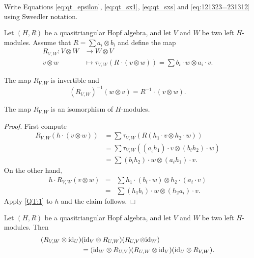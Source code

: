 \begin{exercise}
Write Equations \eqref{eq:qt_epsilon}, \eqref{eq:qt_sx1}, \eqref{eq:qt_sxs}
and \eqref{eq:121323=231312} using Sweedler notation.
\end{exercise}

\label{paragraph:QT_braiding}
Let $(H,R)$ be a quasitriangular Hopf algebra, and let $V$ and $W$ be
two left $H$-modules. Assume that $R=\sum a_{i}\otimes b_{i}$ and define the map
\begin{align*}
R_{V,W}:V\otimes W&\to W\otimes V\\
v\otimes w&\mapsto \tau_{V,W}\left(R\cdot (v\otimes w)\right)=\sum b_{i}\cdot w\otimes a_{i}\cdot v.
\end{align*}

The map $R_{V,W}$ is invertible and 
\[
\left(R_{V,W}\right)^{-1}(w\otimes v)=R^{-1}\cdot(v\otimes w).
\]

\begin{lemma}
The map $R_{V,W}$ is an isomorphism of $H$-modules.
\end{lemma}

\begin{proof}
First compute 
\begin{align*}
R_{V,W}\left(h\cdot(v\otimes w)\right) & =\sum\tau_{V,W}\left(R(h_{1}\cdot v\otimes h_{2}\cdot w)\right)\\
 & =\sum\tau_{V,W}\left((a_{_{i}}h_{1})\cdot v\otimes(b_{i}h_{2})\cdot w\right)\\
 & =\sum(b_{i}h_{2})\cdot w\otimes(a_{i}h_{1})\cdot v.
\end{align*}
On the other hand,
\begin{eqnarray*}
h\cdot R_{V,W}(v\otimes w) & = & \sum h_{1}\cdot(b_{i}\cdot w)\otimes h_{2}\cdot(a_{i}\cdot v)\\
 & = & \sum(h_{1}b_{i})\cdot w\otimes(h_{2}a_{i})\cdot v.
\end{eqnarray*}
Apply \eqref{QT:1} to $h$ and the claim follows.
\end{proof}

\begin{proposition}
\label{proposition:braid_equation}
Let $(H,R)$ be a quasitriangular Hopf algebra, and let $V$ and $W$ be two left
$H$-modules. Then 
\begin{align} 
(R_{V,W}\otimes\id_{U}) & (\id_{V}\otimes
R_{U,W})(R_{U,V}\mathrm{\otimes id}_{W})\nonumber \\ & =(\id_{W}\otimes
R_{U,V})(R_{U,W}\otimes\id_{V})(\id_{U}\otimes
R_{V,W}).\label{eq:braid_equation} 
\end{align}
\end{proposition}

